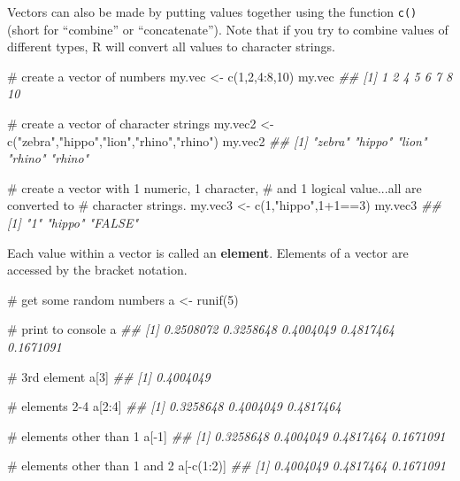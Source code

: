 \documentclass[
  13,
  letterpaper,
]{report}
\newenvironment{Shaded}{\begin{snugshade}}{\end{snugshade}}
\newcommand{\CommentTok}[1]{\textcolor[rgb]{0.37,0.37,0.37}{#1}}
\newcommand{\DecValTok}[1]{\textcolor[rgb]{0.68,0.00,0.00}{#1}}
\newcommand{\DocumentationTok}[1]{\textcolor[rgb]{0.37,0.37,0.37}{\textit{#1}}}
\newcommand{\FunctionTok}[1]{\textcolor[rgb]{0.28,0.35,0.67}{#1}}
\newcommand{\NormalTok}[1]{\textcolor[rgb]{0.00,0.23,0.31}{#1}}
\newcommand{\OtherTok}[1]{\textcolor[rgb]{0.00,0.23,0.31}{#1}}
\newcommand{\SpecialCharTok}[1]{\textcolor[rgb]{0.37,0.37,0.37}{#1}}
\newcommand{\StringTok}[1]{\textcolor[rgb]{0.13,0.47,0.30}{#1}}
\begin{document}
Vectors can also be made by putting values together using the function
\texttt{c()} (short for ``combine'' or ``concatenate''). Note that if
you try to combine values of different types, R will convert all values
to character strings.

\begin{Shaded}
\begin{Highlighting}[]
\CommentTok{\# create a vector of numbers}
\NormalTok{my.vec }\OtherTok{\textless{}{-}} \FunctionTok{c}\NormalTok{(}\DecValTok{1}\NormalTok{,}\DecValTok{2}\NormalTok{,}\DecValTok{4}\SpecialCharTok{:}\DecValTok{8}\NormalTok{,}\DecValTok{10}\NormalTok{)}
\NormalTok{my.vec}
\DocumentationTok{\#\# [1]  1  2  4  5  6  7  8 10}

\CommentTok{\# create a vector of character strings}
\NormalTok{my.vec2 }\OtherTok{\textless{}{-}} \FunctionTok{c}\NormalTok{(}\StringTok{"zebra"}\NormalTok{,}\StringTok{"hippo"}\NormalTok{,}\StringTok{"lion"}\NormalTok{,}\StringTok{"rhino"}\NormalTok{,}\StringTok{"rhino"}\NormalTok{)}
\NormalTok{my.vec2}
\DocumentationTok{\#\# [1] "zebra" "hippo" "lion"  "rhino" "rhino"}

\CommentTok{\# create a vector with 1 numeric, 1 character,}
\CommentTok{\# and 1 logical value...all are converted to}
\CommentTok{\# character strings.}
\NormalTok{my.vec3 }\OtherTok{\textless{}{-}} \FunctionTok{c}\NormalTok{(}\DecValTok{1}\NormalTok{,}\StringTok{"hippo"}\NormalTok{,}\DecValTok{1}\SpecialCharTok{+}\DecValTok{1}\SpecialCharTok{==}\DecValTok{3}\NormalTok{)}
\NormalTok{my.vec3}
\DocumentationTok{\#\# [1] "1"     "hippo" "FALSE"}
\end{Highlighting}
\end{Shaded}

Each value within a vector is called an \textbf{element}. Elements of a
vector are accessed by the bracket notation.

\begin{Shaded}
\begin{Highlighting}[]
\CommentTok{\# get some random numbers}
\NormalTok{a }\OtherTok{\textless{}{-}} \FunctionTok{runif}\NormalTok{(}\DecValTok{5}\NormalTok{)}

\CommentTok{\# print to console}
\NormalTok{a          }
\DocumentationTok{\#\# [1] 0.2508072 0.3258648 0.4004049 0.4817464 0.1671091}

\CommentTok{\# 3rd element}
\NormalTok{a[}\DecValTok{3}\NormalTok{]       }
\DocumentationTok{\#\# [1] 0.4004049}

\CommentTok{\# elements 2{-}4}
\NormalTok{a[}\DecValTok{2}\SpecialCharTok{:}\DecValTok{4}\NormalTok{]     }
\DocumentationTok{\#\# [1] 0.3258648 0.4004049 0.4817464}

\CommentTok{\# elements other than 1}
\NormalTok{a[}\SpecialCharTok{{-}}\DecValTok{1}\NormalTok{]      }
\DocumentationTok{\#\# [1] 0.3258648 0.4004049 0.4817464 0.1671091}

\CommentTok{\# elements other than 1 and 2}
\NormalTok{a[}\SpecialCharTok{{-}}\FunctionTok{c}\NormalTok{(}\DecValTok{1}\SpecialCharTok{:}\DecValTok{2}\NormalTok{)] }
\DocumentationTok{\#\# [1] 0.4004049 0.4817464 0.1671091}
\end{Highlighting}
\end{Shaded}
\end{document}
